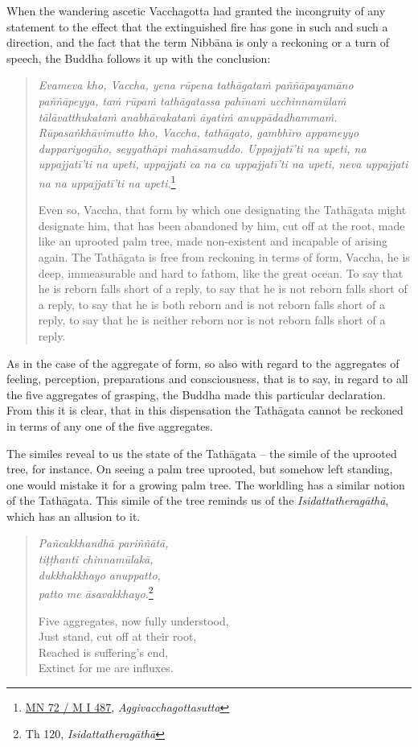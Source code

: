 When the wandering ascetic Vacchagotta had granted the incongruity of any statement to the effect that the extinguished fire has gone in such and such a direction, and the fact that the term Nibbāna is only a reckoning or a turn of speech, the Buddha follows it up with the conclusion:

\begin{quote}
\emph{Evameva kho, Vaccha, yena rūpena tathāgataṁ paññāpayamāno paññāpeyya, taṁ rūpaṁ tathāgatassa pahīnaṁ ucchinnamūlaṁ tālāvatthukataṁ anabhāvakataṁ āyatiṁ anuppādadhammaṁ. Rūpasaṅkhāvimutto kho, Vaccha, tathāgato, gambhīro appameyyo duppariyogāho, seyyathāpi mahāsamuddo. Uppajjatī'ti na upeti, na uppajjatī'ti na upeti, uppajjati ca na ca uppajjatī'ti na upeti, neva uppajjati na na uppajjatī'ti na upeti.}\footnote{\href{https://suttacentral.net/mn72/pli/ms}{MN 72 / M I 487}, \emph{Aggivacchagottasutta}}

Even so, Vaccha, that form by which one designating the Tathāgata might designate him, that has been abandoned by him, cut off at the root, made like an uprooted palm tree, made non-existent and incapable of arising again. The Tathāgata is free from reckoning in terms of form, Vaccha, he is deep, immeasurable and hard to fathom, like the great ocean. To say that he is reborn falls short of a reply, to say that he is not reborn falls short of a reply, to say that he is both reborn and is not reborn falls short of a reply, to say that he is neither reborn nor is not reborn falls short of a reply.
\end{quote}

As in the case of the aggregate of form, so also with regard to the aggregates of feeling, perception, preparations and consciousness, that is to say, in regard to all the five aggregates of grasping, the Buddha made this particular declaration. From this it is clear, that in this dispensation the Tathāgata cannot be reckoned in terms of any one of the five aggregates.

The similes reveal to us the state of the Tathāgata -- the simile of the uprooted tree, for instance. On seeing a palm tree uprooted, but somehow left standing, one would mistake it for a growing palm tree. The worldling has a similar notion of the Tathāgata. This simile of the tree reminds us of the \emph{Isidattatheragāthā}, which has an allusion to it.

\begin{quote}
\emph{Pañcakkhandhā pariññātā,}\\
\emph{tiṭṭhanti chinnamūlakā,}\\
\emph{dukkhakkhayo anuppatto,}\\
\emph{patto me āsavakkhayo.}\footnote{Th 120, \emph{Isidattatheragāthā}}

Five aggregates, now fully understood,\\
Just stand, cut off at their root,\\
Reached is suffering's end,\\
Extinct for me are influxes.
\end{quote}

